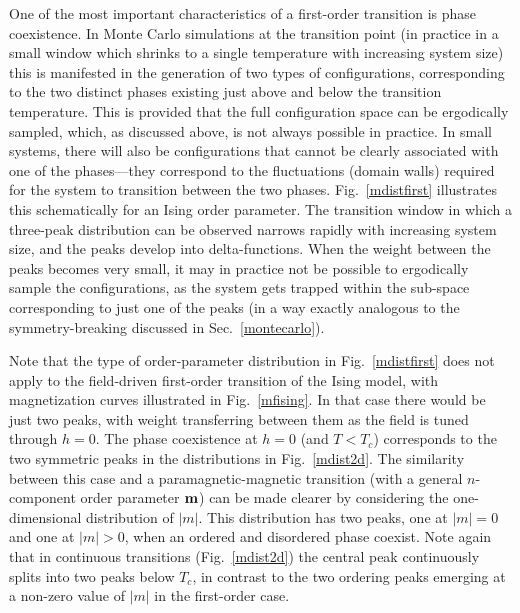 \documentclass[draft,numberedheadings]{aipproc}
\begin{document}
One of the most important characteristics of a first-order transition is phase coexistence. In Monte Carlo simulations at the transition point
(in practice in a small window which shrinks to a single temperature with increasing system size) this is manifested in the generation of two types 
of configurations, corresponding to the two distinct phases existing just above and below the transition temperature. This is provided that the full 
configuration space can be ergodically sampled, which, as discussed above, is not always possible in practice. In small systems, there will also be 
configurations that cannot be clearly associated with one of the phases---they correspond to the fluctuations (domain walls) required for the system to 
transition between the two phases. Fig.~\ref{mdistfirst} illustrates this schematically for an Ising order parameter. The transition window in which a 
three-peak distribution can be observed narrows rapidly with increasing system size, and the peaks develop into delta-functions. When the weight between 
the peaks becomes very small, it may in practice not be possible to ergodically sample the configurations, as the system gets trapped within the sub-space
corresponding to just one of the peaks (in a way exactly analogous to the symmetry-breaking discussed in Sec.~\ref{montecarlo}).

Note that the type of order-parameter distribution in Fig.~\ref{mdistfirst} does not apply to the field-driven first-order transition of the Ising model, 
with magnetization curves illustrated in Fig.~\ref{mfising}. In that case there would be just two peaks, with weight transferring between them as the field 
is tuned through $h=0$. The phase coexistence at $h=0$ (and $T<T_c$) corresponds to the two symmetric peaks in the distributions in Fig.~\ref{mdist2d}. The 
similarity between this case and a paramagnetic-magnetic transition (with a general $n$-component order parameter ${\bf m}$) can be made clearer by considering 
the one-dimensional distribution of $|m|$. This distribution has two peaks, one at $|m|=0$ and one at $|m|>0$, when an ordered and disordered phase coexist. 
Note again that in continuous transitions (Fig.~\ref{mdist2d}) the central peak continuously splits into two peaks below $T_c$, in contrast to the two 
ordering peaks emerging at a non-zero value of $|m|$ in the first-order case.
\end{document}
